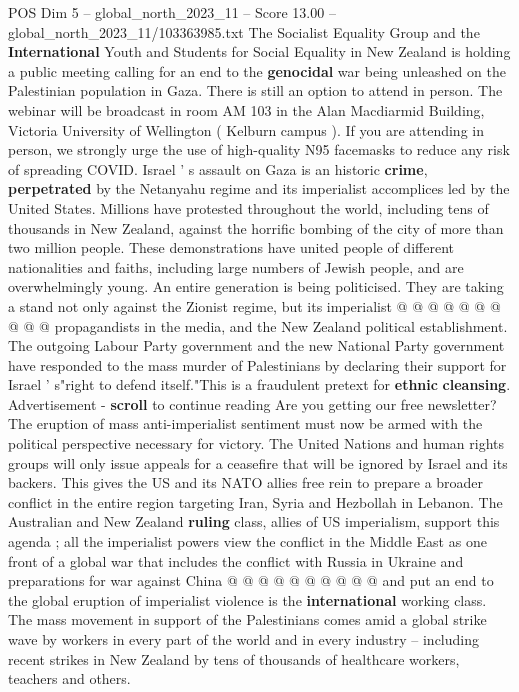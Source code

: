 \begin{textsample}{POS Dim 5 – global\_north\_2023\_11 – Score 13.00 – global\_north\_2023\_11/103363985.txt}  \label{ex:f5_pos_419}
The Socialist Equality Group and the \textbf{International} Youth and Students for Social Equality in New Zealand is holding a public meeting calling for an end to the \textbf{genocidal} war being unleashed on the Palestinian population in Gaza.
There is still an option to attend in person.
The webinar will be broadcast in room AM 103 in the Alan Macdiarmid Building, Victoria University of Wellington ( Kelburn campus ).
If you are attending in person, we strongly urge the use of high-quality N95 facemasks to reduce any risk of spreading COVID.
Israel ' s assault on Gaza is an historic \textbf{crime}, \textbf{perpetrated} by the Netanyahu regime and its imperialist accomplices led by the United States.
Millions have protested throughout the world, including tens of thousands in New Zealand, against the horrific bombing of the city of more than two million people.
These demonstrations have united people of different nationalities and faiths, including large numbers of Jewish people, and are overwhelmingly young.
An entire generation is being politicised.
They are taking a stand not only against the Zionist regime, but its imperialist @ @ @ @ @ @ @ @ @ @ propagandists in the media, and the New Zealand political establishment.
The outgoing Labour Party government and the new National Party government have responded to the mass murder of Palestinians by declaring their support for Israel ' s"right to defend itself."This is a fraudulent pretext for \textbf{ethnic} \textbf{cleansing}.
Advertisement - \textbf{scroll} to continue reading Are you getting our free newsletter?
The eruption of mass anti-imperialist sentiment must now be armed with the political perspective necessary for victory.
The United Nations and human rights groups will only issue appeals for a ceasefire that will be ignored by Israel and its backers.
This gives the US and its NATO allies free rein to prepare a broader conflict in the entire region targeting Iran, Syria and Hezbollah in Lebanon.
The Australian and New Zealand \textbf{ruling} class, allies of US imperialism, support this agenda ; all the imperialist powers view the conflict in the Middle East as one front of a global war that includes the conflict with Russia in Ukraine and preparations for war against China @ @ @ @ @ @ @ @ @ @ and put an end to the global eruption of imperialist violence is the \textbf{international} working class.
The mass movement in support of the Palestinians comes amid a global strike wave by workers in every part of the world and in every industry -- including recent strikes in New Zealand by tens of thousands of healthcare workers, teachers and others.

\end{textsample}
